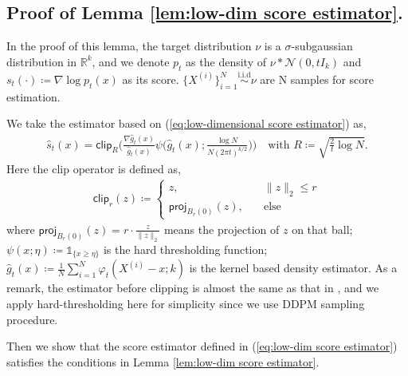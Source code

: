 \documentclass{article}
\newcommand{\ind}{\mathds{1}}
\newcommand{\defn}{\coloneqq}
\newcommand{\clip}{\mathsf{clip}}
\newcommand{\proj}{\mathsf{proj}}
\theoremstyle{plain}
\theoremstyle{remark}
\begin{document}
\subsection{Proof of Lemma \ref{lem:low-dim score estimator}.}
\label{pf-of-lem:lem:low-dim score estimator}
In the proof of this lemma, the target distribution $\nu$ is a $\sigma$-subgaussian distribution in $\mathbb{R}^k$,
and we denote $p_t$ as the density of $\nu \ast \mathcal{N}(0,tI_k)$ and $s_t(\cdot) \defn \nabla \log p_t(x)$ as its score.
$\{X^{(i)}\}_{i=1}^N \overset{\text{i.i.d}}{\sim} \nu $ are N samples for score estimation.


We take the estimator based on (\ref{eq:low-dimensional score estimator}) as,
    \begin{align}
        \widehat{s}_t(x) = \clip_R\Big( \frac{\nabla \widehat{g}_t(x)}{\widehat{g}_t(x)} \psi\Big(\widehat{g}_t(x);\frac{\log N}{N(2\pi t)^{k/2}}\Big)\Big) \quad \text{with } R \defn \sqrt{\frac{2}{t} \log N}. \label{eq:low-dim score estimator}
    \end{align}
    Here the clip operator is defined as, 
    \begin{align*}
    \clip_r(z) \defn 
    \begin{cases}
        z, \quad &\|z\|_2 \leq  r \\
        \proj_{B_r(0)}(z) ,\quad &\text{else}
    \end{cases}
    \end{align*}
    where $\proj_{B_r(0)}(z) = r \cdot \frac{z}{\|z\|_2}$ means the projection of $z$ on that ball; $\psi(x;\eta) \defn \ind_{\{x\geq \eta \}}$ is the hard thresholding function; 
    $\widehat{g}_t(x) \defn \frac{1}{N}\sum_{i=1}^N \varphi_t(X^{(i)}-x;k)$ is the kernel based density estimator.
    As a remark, the estimator before clipping is almost the same as that in \citet{cai2025minimaxoptimalityprobabilityflow}, 
    and we apply hard-thresholding here for simplicity since we use DDPM sampling procedure.

Then we show that the score estimator defined in (\ref{eq:low-dim score estimator}) satisfies the conditions in Lemma \ref{lem:low-dim score estimator}. 
\end{document}
